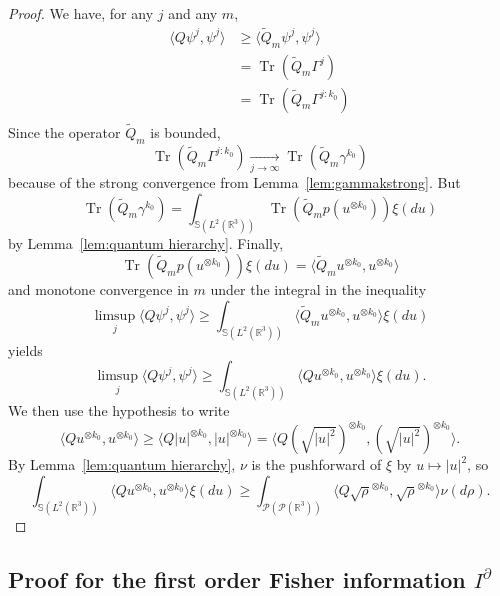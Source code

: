 \documentclass[11pt,a4paper]{article}
\theoremstyle{definition}
\theoremstyle{plain}
\DeclareMathOperator*{\Tr}{Tr}
\begin{document}
\begin{proof}
    We have, for any $j$ and any $m$,
    \begin{align*}
        \langle Q\psi^j,\psi^j\rangle &\geq\langle \tilde{Q}_m\psi^j,\psi^j\rangle\\
        &=\Tr(\tilde{Q}_m\Gamma^j)\\
        &=\Tr(\tilde{Q}_m\Gamma^{j:k_0})\\
    \end{align*}
    Since the operator $\tilde{Q}_m$ is bounded, 
    $$\Tr(\tilde{Q}_m\Gamma^{j:k_0})\xrightarrow[j\rightarrow \infty]{}\Tr(\tilde{Q}_m\gamma^{k_0})$$
    because of the strong convergence from Lemma~\ref{lem:gammakstrong}. But 
    $$\Tr(\tilde{Q}_m\gamma^{k_0})=\int_{\mathbb{S}(L^2(\mathbb{R}^{3}))} \Tr(\tilde{Q}_m p(u^{\otimes k_0})) \xi(du)$$
    by Lemma~\ref{lem:quantum hierarchy}. Finally,
    $$\Tr(\tilde{Q}_m p(u^{\otimes k_0})) \xi(du) = \langle \tilde{Q}_m u^{\otimes k_0},u^{\otimes k_0}\rangle$$ and monotone convergence in $m$ under the integral in the inequality
    $$\limsup_j\langle Q\psi^j,\psi^j\rangle \geq \int_{\mathbb{S}(L^2(\mathbb{R}^{3}))} \langle \tilde{Q}_m u^{\otimes k_0},u^{\otimes k_0}\rangle \xi(du)$$
    yields
    $$\limsup_j \langle Q\psi^j,\psi^j\rangle \geq \int_{\mathbb{S}(L^2(\mathbb{R}^{3}))} \langle Q u^{\otimes k_0},u^{\otimes k_0}\rangle \xi(du).$$
    We then use the hypothesis to write
    \begin{equation}
    \label{eq:usingpospreserv}
        \langle Q u^{\otimes k_0},u^{\otimes k_0}\rangle \geq \langle Q \vert u\vert^{\otimes k_0}, \vert u\vert^{\otimes k_0}\rangle = \langle Q (\sqrt{\vert u\vert^2})^{\otimes k_0}, (\sqrt{\vert u\vert^2})^{\otimes k_0}\rangle.
    \end{equation}
    By Lemma~\ref{lem:quantum hierarchy}, $\nu$ is the pushforward of $\xi$ by $u\mapsto \vert u \vert^2$, so
    $$\int_{\mathbb{S}(L^2(\mathbb{R}^{3}))} \langle Q u^{\otimes k_0},u^{\otimes k_0}\rangle \xi(du)\geq \int_{\mathcal{P}(\mathcal{P}(\mathbb{R}^{3}))} \langle Q \sqrt\rho^{\otimes k_0},\sqrt\rho^{\otimes k_0}\rangle \nu(d\rho).$$
\end{proof}

\subsection{Proof for the first order Fisher information $I^\partial$}
\end{document}
